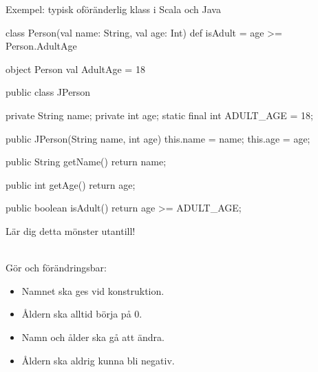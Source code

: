 \begin{Slide}{Exempel: typisk oföränderlig klass i Scala och Java}\SlideFontTiny
\vspace{-1em}
\begin{multicols}{2}
\begin{CodeSmall}[basicstyle=\ttfamily\SlideFontSize{5.7}{6.7}]
class Person(val name: String, val age: Int){
  def isAdult = age >= Person.AdultAge
}

object Person {
  val AdultAge = 18
}
\end{CodeSmall}

\columnbreak

\pause
\begin{CodeSmall}[language=Java,basicstyle=\ttfamily\SlideFontSize{5.7}{6.7}]
public class JPerson {
    private String name;
    private int age;
    static final int ADULT_AGE = 18;
      
    public JPerson(String name, int age){
      this.name = name;
      this.age = age;
    }

    public String getName(){
        return name;
    }

    public int getAge(){
        return age;
    }
    
    public boolean isAdult(){
        return age >= ADULT_AGE;
    }
}
\end{CodeSmall}
Lär dig detta mönster utantill!
\end{multicols}
\pause\vspace{-10em} \\Gör  och  förändringsbar:
\begin{itemize}
\item Namnet ska ges vid konstruktion.
\item Åldern ska alltid börja på 0.
\item Namn och ålder ska gå att ändra.
\item Åldern ska aldrig kunna bli negativ.
\end{itemize}
\end{Slide}


